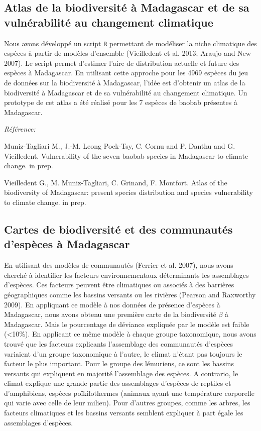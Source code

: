 \documentclass[12pt,]{article}
\begin{document}
\hypertarget{atlas-de-la-biodiversite-a-madagascar-et-de-sa-vulnerabilite-au-changement-climatique}{%
\subsection{Atlas de la biodiversité à Madagascar et de sa vulnérabilité
au changement
climatique}\label{atlas-de-la-biodiversite-a-madagascar-et-de-sa-vulnerabilite-au-changement-climatique}}

Nous avons développé un script \texttt{R} permettant de modéliser la
niche climatique des espèces à partir de modèles d'ensemble (Vieilledent
et al. 2013; Araujo and New 2007). Le script permet d'estimer l'aire de
distribution actuelle et future des espèces à Madagascar. En utilisant
cette approche pour les 4969 espèces du jeu de données sur la
biodiversité à Madagascar, l'idée est d'obtenir un atlas de la
biodiversité à Madagascar et de sa vulnérabilité au changement
climatique. Un prototype de cet atlas a été réalisé pour les 7 espèces
de baobab présentes à Madagascar.

\emph{Référence:}

Muniz-Tagliari M., J.-M. Leong Pock-Tsy, C. Cornu and P. Danthu and G.
Vieilledent. Vulnerability of the seven baobab species in Madagascar to
climate change. in prep.

Vieilledent G., M. Muniz-Tagliari, C. Grinand, F. Montfort. Atlas of the
biodiversity of Madagascar: present species distribution and species
vulnerability to climate change. in prep.

\hypertarget{cartes-de-biodiversite-et-des-communautes-despeces-a-madagascar}{%
\subsection{Cartes de biodiversité et des communautés d'espèces à
Madagascar}\label{cartes-de-biodiversite-et-des-communautes-despeces-a-madagascar}}

En utilisant des modèles de communautés (Ferrier et al. 2007), nous
avons cherché à identifier les facteurs environnementaux déterminants
les assemblages d'espèces. Ces facteurs peuvent être climatiques ou
associés à des barrières géographiques comme les bassins versants ou les
rivières (Pearson and Raxworthy 2009). En appliquant ce modèle à nos
données de présence d'espèces à Madagascar, nous avons obtenu une
première carte de la biodiversité \(\beta\) à Madagascar. Mais le
pourcentage de déviance expliquée par le modèle est faible
(\textless{}10\%). En applicant ce même modèle à chaque groupe
taxonomique, nous avons trouvé que les facteurs explicants l'assemblage
des communautés d'espèces variaient d'un groupe taxonomique à l'autre,
le climat n'étant pas toujours le facteur le plus important. Pour le
groupe des lémuriens, ce sont les bassins versants qui expliquent en
majorité l'assemblage des espèces. A contrario, le climat explique une
grande partie des assemblages d'espèces de reptiles et d'amphibiens,
espèces poïkilothermes (animaux ayant une température corporelle qui
varie avec celle de leur milieu). Pour d'autres groupes, comme les
arbres, les facteurs climatiques et les bassins versants semblent
expliquer à part égale les assemblages d'espèces.
\end{document}

